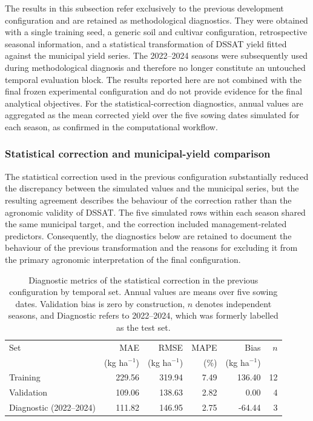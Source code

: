 \documentclass[times,final,authoryear]{elsarticle}
\begin{document}
The results in this subsection refer exclusively to the previous development configuration and are retained as methodological diagnostics. They were obtained with a single training seed, a generic soil and cultivar configuration, retrospective seasonal information, and a statistical transformation of DSSAT yield fitted against the municipal yield series. The 2022--2024 seasons were subsequently used during methodological diagnosis and therefore no longer constitute an untouched temporal evaluation block. The results reported here are not combined with the final frozen experimental configuration and do not provide evidence for the final analytical objectives. For the statistical-correction diagnostics, annual values are aggregated as the mean corrected yield over the five sowing dates simulated for each season, as confirmed in the computational workflow.

\subsubsection{Statistical correction and municipal-yield comparison}
\label{subres_diagnostic_correction}

The statistical correction used in the previous configuration substantially reduced the discrepancy between the simulated values and the municipal series, but the resulting agreement describes the behaviour of the correction rather than the agronomic validity of DSSAT. The five simulated rows within each season shared the same municipal target, and the correction included management-related predictors. Consequently, the diagnostics below are retained to document the behaviour of the previous transformation and the reasons for excluding it from the primary agronomic interpretation of the final configuration.

\begin{table}[!h]
\centering
\caption{Diagnostic metrics of the statistical correction in the previous configuration by temporal set. Annual values are means over five sowing dates. Validation bias is zero by construction, $n$ denotes independent seasons, and Diagnostic refers to 2022--2024, which was formerly labelled as the test set.}
\label{tab_metricas_calibracao}
\begin{tabular}{lrrrrr}
\hline
Set & MAE & RMSE & MAPE & Bias & $n$ \\
    & (kg ha$^{-1}$) & (kg ha$^{-1}$) & (\%) & (kg ha$^{-1}$) & \\
\hline
Training   & 229.56 & 319.94 & 7.49 & 136.40 & 12 \\
Validation & 109.06 & 138.63 & 2.82 & 0.00   & 4  \\
Diagnostic (2022--2024) & 111.82 & 146.95 & 2.75 & -64.44 & 3  \\
\hline
\end{tabular}
\end{table}
\end{document}
